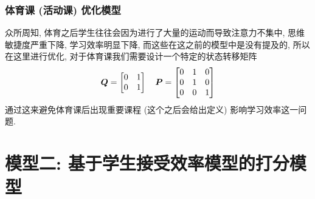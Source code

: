 \documentclass[a4paper]{article}
\renewcommand{\matrix}{\matrixsym} %
\begin{document}
  \subsubsection{体育课 (活动课) 优化模型}
   众所周知, 体育之后学生往往会因为进行了大量的运动而导致注意力不集中, 思维敏捷度严重下降, 学习效率明显下降, 而这些在这之前的模型中是没有提及的, 所以在这里进行优化, 对于体育课我们需要设计一个特定的状态转移矩阵
   \begin{equation}
   \matrix{Q}=\begin{bmatrix}
   0 & 1 \\
   0 & 1
   \end{bmatrix}\quad
   \matrix{P}=\begin{bmatrix}
   0 & 1 & 0 \\
   0 & 1 & 0 \\
   0 & 0 & 1
   \end{bmatrix}
   \end{equation}
   通过这来避免体育课后出现重要课程 (这个之后会给出定义) 影响学习效率这一问题.
\clearpage
\section{模型二: 基于学生接受效率模型的打分模型}
\end{document}
